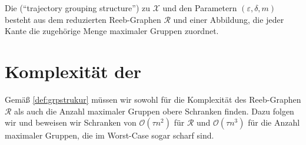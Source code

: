 \begin{definition}[{name=[{\GrpStruktur}]},label=def:grpstrukur]
	Die \Index{\GrpStruktur} (\enquote{trajectory grouping structure}) zu $\mathcal{X}$ und den Parametern $(\varepsilon,\delta,m)$ besteht aus dem reduzierten Reeb-Graphen $\mathcal{R}$ und einer Abbildung, die jeder Kante die zugehörige Menge maximaler Gruppen zuordnet.
\end{definition}

\section{Komplexität der \GrpStruktur} %
\label{sec:komplex}
Gemäß \cref{def:grpstrukur} müssen wir sowohl für die Komplexität des Reeb-Graphen $\mathcal{R}$ als auch die Anzahl maximaler Gruppen obere Schranken finden.
Dazu folgen wir \textcite[Sec.~2.1~\&~2.2]{buchin2015} und beweisen wir Schranken von $\mathcal{O}(\tau n^2)$ für $\mathcal{R}$ und $\mathcal{O}(\tau n^3)$ für die Anzahl maximaler Gruppen, die im Worst-Case sogar scharf sind.

